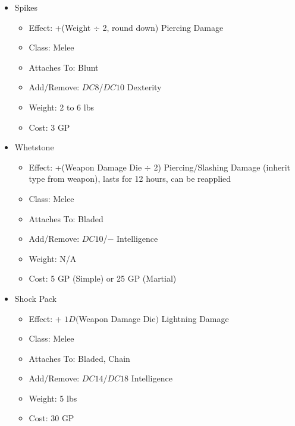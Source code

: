 \documentclass[12pt, twoside]{article}
\begin{document}
\begin{FlushLeft}
\begin{multicols}{2}
			\begin{itemize}[wide]
				\item Spikes
				\begin{itemize}
					\item Effect: +(Weight $\div$ 2, round down) Piercing Damage
					\item Class: Melee
					\item Attaches To: Blunt
					\item Add/Remove: $DC8$/$DC10$ Dexterity
					\item Weight: 2 to 6 lbs
					\item Cost: 3 GP
				\end{itemize}
				\item Whetstone
				\begin{itemize}
					\item Effect: +(Weapon Damage Die $\div$ 2) Piercing/Slashing Damage (inherit type from weapon), lasts for 12 hours, can be reapplied
					\item Class: Melee
					\item Attaches To: Bladed
					\item Add/Remove: $DC10$/$-$ Intelligence
					\item Weight: N/A
					\item Cost: 5 GP (Simple) or 25 GP (Martial)
				\end{itemize}
				\item Shock Pack
				\begin{itemize}
					\item Effect: + $1D($Weapon Damage Die$)$ Lightning Damage
					\item Class: Melee
					\item Attaches To: Bladed, Chain
					\item Add/Remove: $DC14$/$DC18$ Intelligence
					\item Weight: 5 lbs
					\item Cost: 30 GP
				\end{itemize}
			\end{itemize}
			\vfill \pagebreak


\end{multicols}
\end{FlushLeft}
\end{document}
